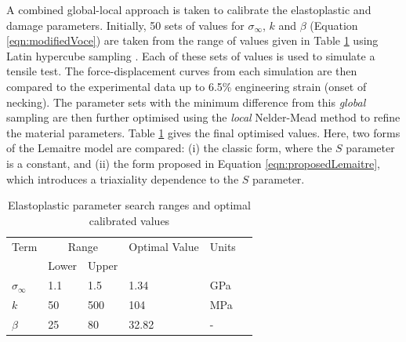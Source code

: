 \documentclass[sn-mathphys,Numbered]{sn-jnl}%
\begin{document}
A combined global-local approach is taken to calibrate the elastoplastic and damage parameters.
Initially, 50 sets of values for $\sigma_{\infty}$, $k$ and $\beta$ (Equation \ref{eqn:modifiedVoce}) are taken from the range of values given in Table \ref{tab:material_model_calibration} using Latin hypercube sampling \cite{loh_latin_1996}.
Each of these sets of values is used to simulate a tensile test. The force-displacement curves from each simulation are then compared to the experimental data up to 6.5\% engineering strain (onset of necking).
The parameter sets with the minimum difference from this \emph{global} sampling are then further optimised using the \emph{local} Nelder-Mead method \cite{luersen_globalized_2004} to refine the material parameters.
Table \ref{tab:material_model_calibration} gives the final optimised values.
Here, two forms of the Lemaitre model are compared: (i) the classic form, where the $S$ parameter is a constant, and (ii) the form proposed in Equation \ref{eqn:proposedLemaitre}, which introduces a triaxiality dependence to the $S$ parameter. 
\begin{table}[htb]
	\centering
		\begin{tabular}{llllll} \hline
			Term  & \multicolumn{2}{c}{Range} & Optimal Value & Units \\ 
				  & Lower & Upper &  &  \\ \hline 
			$\sigma_{\infty}$ & 1.1 & 1.5 & 1.34 & GPa \\
			$k$ & 50 & 500 & 104 & MPa  \\
			$\beta$ & 25 & 80 & 32.82 & - \\
			\hline
		\end{tabular}
	\caption{Elastoplastic parameter search ranges and optimal calibrated values}
	\label{tab:material_model_calibration}
\end{table}
\end{document}
